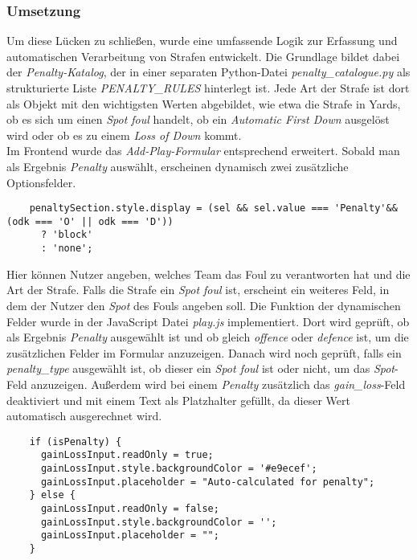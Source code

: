 \subsubsection{Umsetzung}
\vspace*{0.5cm}
Um diese Lücken zu schließen, wurde eine umfassende Logik zur Erfassung und automatischen Verarbeitung von Strafen entwickelt. Die Grundlage bildet dabei der \textit{Penalty-Katalog}, der in einer separaten Python-Datei \textit{penalty\_catalogue.py} als strukturierte Liste \textit{PENALTY\_RULES} hinterlegt ist. Jede Art der Strafe ist dort als Objekt mit den wichtigsten Werten abgebildet, wie etwa die Strafe in Yards, ob es sich um einen \textit{Spot foul} handelt, ob ein \textit{Automatic First Down} ausgelöst wird oder ob es zu einem \textit{Loss of Down} kommt. 
\\
Im Frontend wurde das \textit{Add-Play-Formular} entsprechend erweitert. Sobald man als Ergebnis \textit{Penalty} auswählt, erscheinen dynamisch zwei zusätzliche Optionsfelder.
\vspace*{0.3cm}
\begin{verbatim}
    penaltySection.style.display = (sel && sel.value === 'Penalty'&& (odk === 'O' || odk === 'D'))
      ? 'block'
      : 'none';
\end{verbatim}
\vspace*{0.3cm}
Hier können Nutzer angeben, welches Team das Foul zu verantworten hat und die Art der Strafe. Falls die Strafe ein \textit{Spot foul} ist, erscheint ein weiteres Feld, in dem der Nutzer den \textit{Spot} des Fouls angeben soll. Die Funktion der dynamischen Felder wurde in der JavaScript Datei \textit{play.js} implementiert. Dort wird geprüft, ob als Ergebnis \textit{Penalty} ausgewählt ist und ob gleich \textit{offence} oder \textit{defence} ist, um die zusätzlichen Felder im Formular anzuzeigen. Danach wird noch geprüft, falls ein \textit{penalty\_type} ausgewählt ist, ob dieser ein \textit{Spot foul} ist oder nicht, um das \textit{Spot}-Feld anzuzeigen. Außerdem wird bei einem \textit{Penalty} zusätzlich das \textit{gain\_loss}-Feld deaktiviert und mit einem Text als Platzhalter gefüllt, da dieser Wert automatisch ausgerechnet wird. 
\vspace*{0.3cm}
\begin{verbatim}
    if (isPenalty) {
      gainLossInput.readOnly = true;
      gainLossInput.style.backgroundColor = '#e9ecef';
      gainLossInput.placeholder = "Auto-calculated for penalty";
    } else {
      gainLossInput.readOnly = false;
      gainLossInput.style.backgroundColor = '';
      gainLossInput.placeholder = "";
    }
\end{verbatim}
